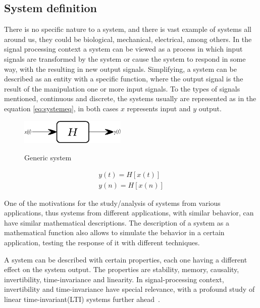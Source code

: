 \subsection{System definition}\label{subsec:SysDef}
There is no specific nature to a system, and there is vast example of systems all around us, they could be biological, mechanical, electrical, among others. In the signal processing context a system can be viewed as a process in which input signals are transformed by the system or cause the system to respond in some way, with the resulting in new output signals. Simplifying, a system can be described as an entity with a specific function, where the output signal is the result of the manipulation one or more input signals.
To the types of signals mentioned, continuous and discrete, the systems usually are represented as in the equation \ref{eq:systemeq}, in both cases $x$ represents input and $y$ output.
\begin{figure}[]
    \centering
    \includegraphics[width=0.45\textwidth]{Chapters/2CHP/Diagrams/systemIll.eps}
    \caption{Generic system}{}    
    \label{fig:systemIll}
\end{figure}
\begin{equation} \label{eq:systemeq}
    \begin{split}
        y(t) = H[x(t)] \\
        y(n) = H[x(n)]
    \end{split}
\end{equation}

One of the motivations for the study/analysis of systems from various applications, thus systems from different applications, with similar behavior, can have similar mathematical descriptions. The description of a system as a mathematical function also allows to simulate the behavior in a certain application, testing the response of it with different techniques. 

A system can be described with certain properties, each one having a different effect on the system output. The properties are stability, memory, causality, invertibility, time-invariance and linearity. In signal-processing context, invertibility and time-invariance have special relevance, with a profound study of linear time-invariant(LTI) systems further ahead~\cite{oppenheimSignalsSystems1997,haykin1999signals}.
